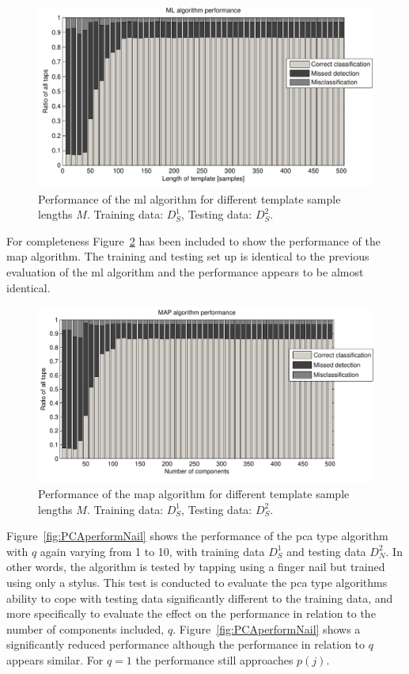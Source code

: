 \begin{figure}[!] %
\centering
\includegraphics[width=150mm]{MLperform.pdf}
\caption{Performance of the \gls{ml} algorithm for different template sample lengths $M$. Training data: $D^1_S$, Testing data: $D^2_S$.}\label{fig:MLperform}
\end{figure}

For completeness Figure~\ref{fig:MAPperformLength} has been included to show the performance of the \gls{map} algorithm. The training and testing set up is identical to the previous evaluation of the \gls{ml} algorithm and the performance appears to be almost identical.

\begin{figure}[!] %
\centering
\includegraphics[width=150mm]{MAPperformLength.pdf}
\caption{Performance of the \gls{map} algorithm for different template sample lengths $M$. Training data: $D^1_S$, Testing data: $D^2_S$.}\label{fig:MAPperformLength}
\end{figure}

Figure~\ref{fig:PCAperformNail} shows the performance of the \gls{pca} type algorithm with $q$ again varying from 1 to 10, with training data $D^1_S$ and testing data $D^2_N$. In other words, the algorithm is tested by tapping using a finger nail but trained using only a stylus. This test is conducted to evaluate the \gls{pca} type algorithms ability to cope with testing data significantly different to the training data, and more specifically to evaluate the effect on the performance in relation to the number of components included, $q$. Figure~\ref{fig:PCAperformNail} shows a significantly reduced performance although the performance in relation to $q$ appears similar. For $q=1$ the performance still approaches $p(j)$.


